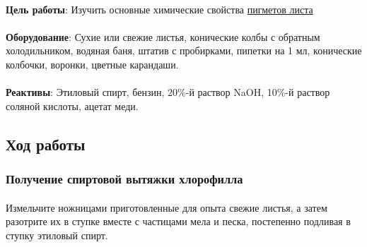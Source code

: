 
\begin{footnotesize}

\paragraph*{}\textbf{Цель работы}: Изучить основные \hypertarget{chem_hlorophil}{химические свойства} \hyperlink{sect_hlorophilus}{пигметов листа}

\paragraph*{}\textbf{Оборудование}: Сухие или свежие листья, конические колбы с обратным холодильником, водяная баня, штатив с пробирками, пипетки на 1 мл, конические колбочки, воронки, цветные карандаши.

\paragraph*{}\textbf{Реактивы}: Этиловый спирт, бензин, 20\%-й раствор NaOH, 10\%-й раствор соляной кислоты, ацетат меди.

\end{footnotesize}

\subsection*{Ход работы}

\subsubsection*{Получение спиртовой вытяжки хлорофилла}

\paragraph*{}Измельчите ножницами приготовленные для опыта свежие листья, а затем разотрите их в ступке вместе с частицами мела и песка, постепенно подливая в ступку этиловый спирт. 

